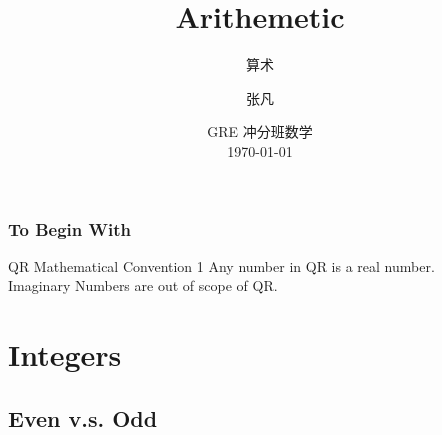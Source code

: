 \documentclass[
	11pt, %
]{beamer}
\title[Arithemetic]{Arithemetic} %
\subtitle{算术} %
\author[张凡]{张凡} %
\institute[XDF]{新东方国际教育 \\ \smallskip \textit{zhangfan@xdf.cn}} %
\date[\today]{GRE 冲分班数学 \\ \today} %
\begin{document}

\begin{frame}
	\titlepage %
\end{frame}




\begin{frame}
	\frametitle{To Begin With}
	\begin{block}{QR Mathematical Convention 1 }
		Any number in QR is a real number. \\ Imaginary Numbers are \alert{out of scope of} QR.
	\end{block}
\end{frame}



\section{Integers}

\subsection{Even v.s. Odd}
\end{document}
